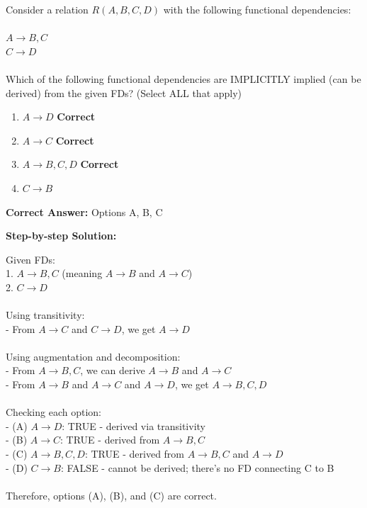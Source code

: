 \documentclass[11pt]{article}
\begin{document}
Consider a relation \(R(A, B, C, D)\) with the following functional dependencies:\\
\\
\(A \rightarrow B, C\)\\
\(C \rightarrow D\)\\
\\
Which of the following functional dependencies are IMPLICITLY implied (can be derived) from the given FDs? (Select ALL that apply)


\begin{enumerate}[label=\textbf{\Alph*.}, leftmargin=1.8em]
\item \(A \rightarrow D\) \hfill {\color{gategreen}\textbf{Correct}}\item \(A \rightarrow C\) \hfill {\color{gategreen}\textbf{Correct}}\item \(A \rightarrow B, C, D\) \hfill {\color{gategreen}\textbf{Correct}}\item \(C \rightarrow B\)\end{enumerate}

\textbf{Correct Answer:} Options A, B, C

\textbf{Step-by-step Solution:}

Given FDs:\\
1. \(A \rightarrow B, C\) (meaning \(A \rightarrow B\) and \(A \rightarrow C\))\\
2. \(C \rightarrow D\)\\
\\
Using transitivity:\\
- From \(A \rightarrow C\) and \(C \rightarrow D\), we get \(A \rightarrow D\)\\
\\
Using augmentation and decomposition:\\
- From \(A \rightarrow B, C\), we can derive \(A \rightarrow B\) and \(A \rightarrow C\)\\
- From \(A \rightarrow B\) and \(A \rightarrow C\) and \(A \rightarrow D\), we get \(A \rightarrow B, C, D\)\\
\\
Checking each option:\\
- (A) \(A \rightarrow D\): TRUE - derived via transitivity\\
- (B) \(A \rightarrow C\): TRUE - derived from \(A \rightarrow B, C\)\\
- (C) \(A \rightarrow B, C, D\): TRUE - derived from \(A \rightarrow B, C\) and \(A \rightarrow D\)\\
- (D) \(C \rightarrow B\): FALSE - cannot be derived; there's no FD connecting C to B\\
\\
Therefore, options (A), (B), and (C) are correct.
\end{document}

